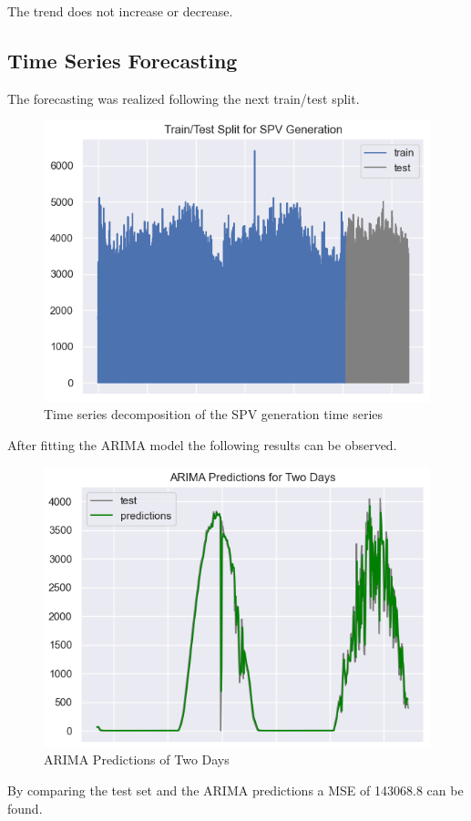 \documentclass[a4paper,12pt]{article}
\begin{document}
The trend does not increase or decrease.

\subsection{Time Series Forecasting}
The forecasting was realized following the next train/test split.

\begin{figure}[H] %
    \centering %
    \includegraphics[height=0.35\textwidth]{traintest.png} %
    \caption{Time series decomposition of the SPV generation time series} %
    \label{fig:etiqueta_imagen} %
\end{figure} 

After fitting the ARIMA model the following results can be observed.

\begin{figure}[H] %
    \centering %
    \includegraphics[height=0.35\textwidth]{ARIMA.png} %
    \caption{ARIMA Predictions of Two Days} %
    \label{fig:etiqueta_imagen} %
\end{figure} 

By comparing the test set and the ARIMA predictions a MSE of 143068.8 can be found.
\end{document}
